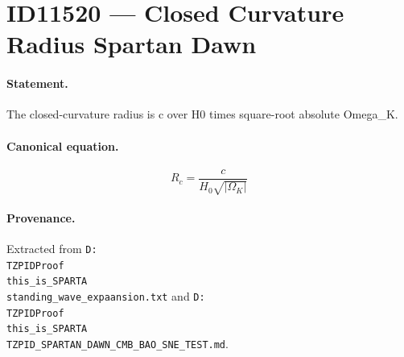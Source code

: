 \section*{ID11520 --- Closed Curvature Radius Spartan Dawn}

\paragraph{Statement.}
The closed-curvature radius is c over H0 times square-root absolute Omega_K.

\paragraph{Canonical equation.}
\[
R_c=\frac{c}{H_0\sqrt{|\Omega_K|}}
\]

\paragraph{Provenance.}
Extracted from \texttt{D:\\TZPIDProof\\this\_is\_SPARTA\\standing\_wave\_expaansion.txt} and \texttt{D:\\TZPIDProof\\this\_is\_SPARTA\\TZPID\_SPARTAN\_DAWN\_CMB\_BAO\_SNE\_TEST.md}.
